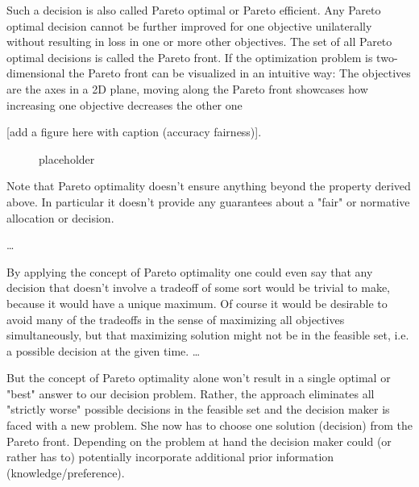 	Such a decision is also called Pareto optimal or Pareto efficient.
	Any Pareto optimal decision cannot be further improved for one objective unilaterally without resulting in loss in one or more other objectives.
	The set of all Pareto optimal decisions is called the Pareto front.
	If the optimization problem is two-dimensional the Pareto front can be visualized in an intuitive way:
	The objectives are the axes in a 2D plane, moving along the Pareto front showcases how increasing one objective decreases the other one

	[add a figure here with caption (accuracy fairness)].
	\begin{figure}
	\begin{center}
			
	\caption{placeholder}
	\end{center}
	\end{figure}

	Note that Pareto optimality doesn't ensure anything beyond the property derived above.
	In particular it doesn't provide any guarantees about a "fair" or normative allocation or decision.
	
	\dots

	By applying the concept of Pareto optimality one could even say that any decision that doesn't involve a tradeoff of some sort would be trivial to make, because it would have a unique maximum.
	Of course it would be desirable to avoid many of the tradeoffs in the sense of maximizing all objectives simultaneously, but that maximizing solution might not be in the feasible set, i.e. a possible decision at the given time.
	\dots

	But the concept of Pareto optimality alone won't result in a single optimal or "best" answer to our decision problem.
	Rather, the approach eliminates all "strictly worse" possible decisions in the feasible set and the decision maker is faced with a new problem.
	She now has to choose one solution (decision) from the Pareto front.
	Depending on the problem at hand the decision maker could (or rather has to) potentially incorporate additional prior information (knowledge/preference).

